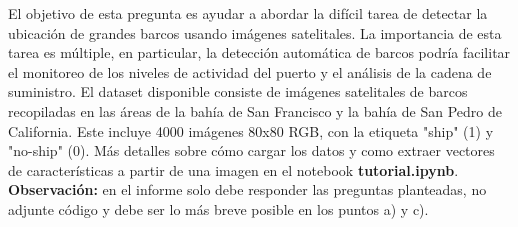 \documentclass[11pt,letterpaper]{article}
\begin{document}
 El objetivo de esta pregunta es ayudar a abordar la difícil tarea de detectar la ubicación de grandes barcos usando imágenes satelitales. La importancia de esta tarea es múltiple, en particular, la detección automática de barcos podría facilitar el monitoreo de los niveles de actividad del puerto y el análisis de la cadena de suministro. El dataset disponible consiste de imágenes satelitales de barcos recopiladas en las áreas de la bahía de San Francisco y la bahía de San Pedro de California.  Este incluye 4000 imágenes 80x80 RGB, con la etiqueta "ship" (1) y "no-ship" (0). Más detalles sobre cómo cargar los datos y como extraer vectores de características a partir de una imagen en el notebook \textbf{tutorial.ipynb}. \textbf{Observación:} en el informe solo debe responder las preguntas planteadas, no adjunte código y debe ser lo más breve posible en los puntos a) y c).
\end{document}
